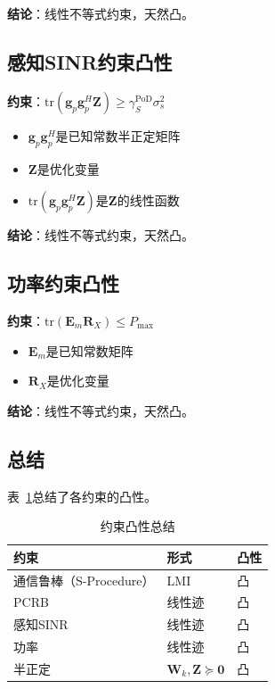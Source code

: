 \documentclass[12pt,a4paper]{article}
\newcommand{\vect}[1]{\mathbf{#1}}
\newcommand{\mat}[1]{\mathbf{#1}}
\newcommand{\tr}{\text{tr}}
\begin{document}
\textbf{结论}：线性不等式约束，天然凸。

\subsection{感知SINR约束凸性}

\textbf{约束}：$\tr(\vect{g}_p \vect{g}_p^H \mat{Z}) \geq \gamma_S^{\text{PoD}} \sigma_s^2$

\begin{itemize}
    \item $\vect{g}_p \vect{g}_p^H$是已知常数半正定矩阵
    \item $\mat{Z}$是优化变量
    \item $\tr(\vect{g}_p \vect{g}_p^H \mat{Z})$是$\mat{Z}$的线性函数
\end{itemize}

\textbf{结论}：线性不等式约束，天然凸。

\subsection{功率约束凸性}

\textbf{约束}：$\tr(\mat{E}_m \mat{R}_X) \leq P_{\max}$

\begin{itemize}
    \item $\mat{E}_m$是已知常数矩阵
    \item $\mat{R}_X$是优化变量
\end{itemize}

\textbf{结论}：线性不等式约束，天然凸。

\subsection{总结}

表~\ref{tab:convexity}总结了各约束的凸性。

\begin{table}[htbp]
\centering
\caption{约束凸性总结}\label{tab:convexity}
\begin{tabular}{lll}
\toprule
约束 & 形式 & 凸性 \\
\midrule
通信鲁棒（S-Procedure） & LMI & 凸 \\
PCRB & 线性迹 & 凸 \\
感知SINR & 线性迹 & 凸 \\
功率 & 线性迹 & 凸 \\
半正定 & $\mat{W}_k, \mat{Z} \succeq \mat{0}$ & 凸 \\
\bottomrule
\end{tabular}
\end{table}
\end{document}

